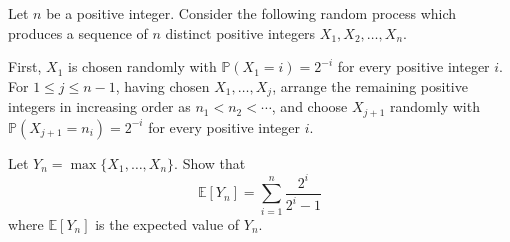 Let \(n\) be a positive integer. Consider the following random process which produces a sequence of \(n\) distinct positive integers \(X_1, X_2, \ldots, X_n\).

First, \(X_1\) is chosen randomly with \(\mathbb{P}(X_1 = i) = 2^{-i}\) for every positive integer \(i\). For \(1 \le j \le n-1\), having chosen \(X_1, \ldots, X_j\), arrange the remaining positive integers in increasing order as \(n_1 < n_2 < \cdots\), and choose \(X_{j+1}\) randomly with \(\mathbb{P}(X_{j+1} = n_i) = 2^{-i}\) for every positive integer \(i\).

Let \(Y_n = \max\{X_1, \ldots, X_n\}\). Show that
\[
\mathbb{E}[Y_n] = \sum_{i=1}^{n} \frac{2^i}{2^i - 1}
\]
where \(\mathbb{E}[Y_n]\) is the expected value of \(Y_n\).
